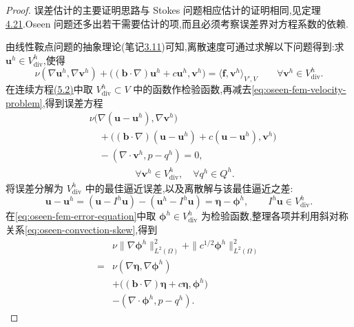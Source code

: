\begin{proof}
误差估计的主要证明思路与 Stokes 问题相应估计的证明相同,见定理\hyperref[thm:stokes-error-velocity-h1]{4.21}.Oseen 问题还多出若干需要估计的项,而且必须考察误差界对方程系数的依赖.

由线性鞍点问题的抽象理论(笔记\hyperref[note:reduction-single-equation]{3.11})可知,离散速度可通过求解以下问题得到:求 $\bm{u}^h\in V_{\mathrm{div}}^h$,使得
\begin{equation}\label{eq:oseen-fem-velocity-problem}
\nu(\nabla\bm{u}^h,\nabla\bm{v}^h)
+\bigl((\bm{b}\cdot\nabla)\bm{u}^h+c\bm{u}^h,\bm{v}^h\bigr)
  =\langle\bm{f},\bm{v}^h\rangle_{V',V}
  \qquad\forall\bm{v}^h\in V_{\mathrm{div}}^h.
\end{equation}
在连续方程\hyperref[eq:oseen-weak]{(5.2)}中取 $V_{\mathrm{div}}^h\subset V$ 中的函数作检验函数,再减去\cref{eq:oseen-fem-velocity-problem},得到误差方程
\begin{equation}\label{eq:oseen-fem-error-equation}
\begin{aligned}
  &\nu\bigl(\nabla(\bm{u}-\bm{u}^h),\nabla\bm{v}^h\bigr)\\
  &\quad+\bigl((\bm{b}\cdot\nabla)(\bm{u}-\bm{u}^h)
       +c(\bm{u}-\bm{u}^h),\bm{v}^h\bigr)\\
  &\quad-(\nabla\cdot\bm{v}^h,p-q^h)=0,\\
  &\hspace{2cm}\forall\bm{v}^h\in V_{\mathrm{div}}^h,\quad
       \forall q^h\in Q^h .
\end{aligned}
\end{equation}
将误差分解为 $V_{\mathrm{div}}^h$ 中的最佳逼近误差,以及离散解与该最佳逼近之差:
\[
  \bm{u}-\bm{u}^h
  =(\bm{u}-I^h\bm{u})-(\bm{u}^h-I^h\bm{u})
   =\symbf{\eta}-\symbf{\phi}^h,
  \qquad I^h\bm{u}\in V_{\mathrm{div}}^h.
\]
在\cref{eq:oseen-fem-error-equation}中取 $\symbf{\phi}^h\in V_{\mathrm{div}}^h$ 为检验函数,整理各项并利用斜对称关系\cref{eq:oseen-convection-skew},得到
\begin{equation}\label{eq:oseen-fem-error-energy-identity}
\begin{aligned}
  &\nu\|\nabla\symbf{\phi}^h\|_{L^2(\Omega)}^2
    +\|c^{1/2}\symbf{\phi}^h\|_{L^2(\Omega)}^2\\
  ={}&\nu(\nabla\symbf{\eta},\nabla\symbf{\phi}^h)\\
   &+\bigl((\bm{b}\cdot\nabla)\symbf{\eta}
        +c\symbf{\eta},\symbf{\phi}^h\bigr)\\
   &-(\nabla\cdot\symbf{\phi}^h,p-q^h).
\end{aligned}
\end{equation}


\end{proof}
